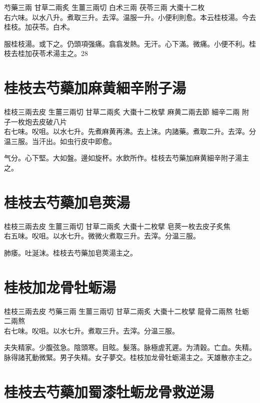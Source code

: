 芍藥{\scriptsize 三兩} 甘草{\scriptsize 二兩炙} 生薑{\scriptsize 三兩切} 白术{\scriptsize 三兩} 茯苓{\scriptsize 三兩} 大棗{\scriptsize 十二枚}\\
右六味。以水八升。煮取三升。去滓。温服一升。小便利則愈。本云桂枝湯。今去桂枝。加茯苓。白术。

服桂枝湯。{\khaaitp 或}下之。仍頭項强痛。翕翕发熱。无汗。心下滿。微痛。小便不利。桂枝去桂加茯苓术湯主之。28

\section{桂枝去芍藥加麻黄細辛附子湯}

桂枝{\scriptsize 三兩去皮} 生薑{\scriptsize 三兩切} 甘草{\scriptsize 二兩炙} 大棗{\scriptsize 十二枚擘} 麻黄{\scriptsize 二兩去節} 細辛{\scriptsize 二兩} 附子{\scriptsize 一枚炮去皮破八片}\\
右七味。㕮咀。以水七升。先煮麻黄再沸。去上沫。内諸藥。煮取二升。去滓。分温三服。当汗出。如虫行皮中即愈。

气分。心下堅。大如盤。邊如旋杯。水飲所作。桂枝去芍藥加麻黄細辛附子湯主之。

\section{桂枝去芍藥加皂莢湯}

桂枝{\scriptsize 三兩去皮} 生薑{\scriptsize 三兩切} 甘草{\scriptsize 二兩炙} 大棗{\scriptsize 十二枚擘} 皂莢{\scriptsize 一枚去皮子炙焦}\\
右五味。㕮咀。以水七升。微微火煮取三升。去滓。分温三服。

肺痿。吐涎沫。桂枝去芍藥加皂莢湯主之。

\section{桂枝加龙骨牡蛎湯}

桂枝{\scriptsize 三兩去皮} 芍藥{\scriptsize 三兩} 生薑{\scriptsize 三兩切} 甘草{\scriptsize 二兩炙} 大棗{\scriptsize 十二枚擘} 龍骨{\scriptsize 二兩熬} 牡蛎{\scriptsize 二兩熬}\\
右七味。㕮咀。以水七升。煮取三升。去滓。分温三服。

夫失精家。少腹弦急。陰頭寒。目眩。髮落。脉極虗芤遲。为清穀。亡血。失精。脉得諸芤動微緊。男子失精。女子夢交。桂枝加龙骨牡蛎湯主之。天雄散亦主之。

\section{桂枝去芍藥加蜀漆牡蛎龙骨救逆湯}

